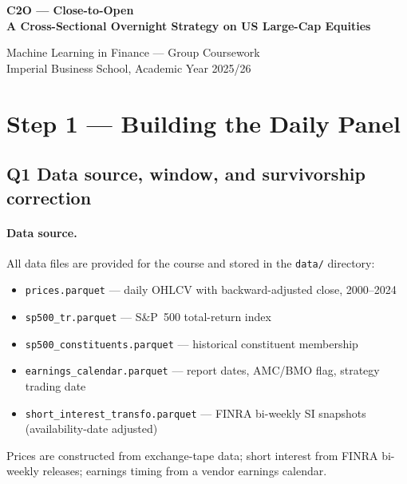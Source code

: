 \documentclass[12pt,a4paper]{article}
\begin{document}
\begin{titlepage}
\centering\vspace*{3cm}
{\LARGE\bfseries C2O --- Close-to-Open\\[0.5em]
A Cross-Sectional Overnight Strategy on US Large-Cap Equities\par}
\vspace{1.5cm}
{\large Machine Learning in Finance --- Group Coursework\\
Imperial Business School, Academic Year 2025/26\par}
\end{titlepage}

\tableofcontents
\newpage

\section{Step 1 --- Building the Daily Panel}

\subsection*{Q1 \quad Data source, window, and survivorship correction}
\label{sec:q1}

\paragraph{Data source.}
All data files are provided for the course and stored in the \texttt{data/} directory:
\begin{itemize}[noitemsep,topsep=2pt,leftmargin=1.5em]
  \item \texttt{prices.parquet} --- daily OHLCV with backward-adjusted close, 2000--2024
  \item \texttt{sp500\_tr.parquet} --- S\&P~500 total-return index
  \item \texttt{sp500\_constituents.parquet} --- historical constituent membership
  \item \texttt{earnings\_calendar.parquet} --- report dates, AMC/BMO flag, strategy trading date
  \item \texttt{short\_interest\_transfo.parquet} --- FINRA bi-weekly SI snapshots (availability-date adjusted)
\end{itemize}
Prices are constructed from exchange-tape data; short interest from FINRA
bi-weekly releases; earnings timing from a vendor earnings calendar.
\end{document}
